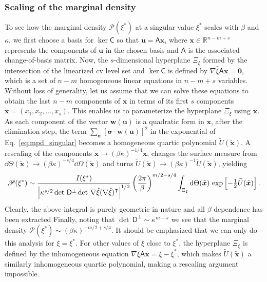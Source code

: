 \subsubsection*{Scaling of the marginal density}
\label{sec:scaling}

To see how the marginal density $\mathscr{P}(\xi^{*})$ at a singular value $\xi^{*}$ scales with $\beta$ and $\kappa$, we first choose a basis for $\ker\mathsf{C}$ so that $\bm{u} = \mathsf{A}\bm{x}$, where $\bm{x} \in \mathbb{R}^{n-m+s}$ represents the components of $\bm{u}$ in the chosen basis and $\mathsf{A}$ is the associated change-of-basis matrix.
Now, the $s$-dimensional hyperplane $\Xi_{\xi}$ formed by the intersection of the linearized \ac{cv} level set and $\ker\mathsf{C}$ is defined by $\nabla\hat{\xi}\mathsf{A}\bm{x} = \bm{0}$, which is a set of $n-m$ homogeneous linear equations in $n-m+s$ variables.
Without loss of generality, let us assume that we can solve these equations to obtain the last $n - m$ components of $\bm{x}$ in terms of its first $s$ components $\tilde{\bm{x}} = (x_{1}, x_{2}, \ldots, x_{s})$.
This enables us to parameterize the hyperplane $\Xi_{\xi}$ using $\tilde{\bm{x}}$.
As each component of the vector $\bm{w}(\bm{u})$ is a quadratic form in $\bm{x}$, after the elimination step, the term $\sum_{\bm{\sigma}}[\bm{\sigma}\cdot\bm{w}(\bm{u})]^{2}$ in the exponential of Eq.~\eqref{eq:mpd_singular} becomes a homogeneous quartic polynomial $\widetilde{U}(\tilde{\bm{x}})$.
A rescaling of the components $\tilde{\bm{x}} \to (\beta\kappa)^{-1/4}\tilde{\bm{x}}$, changes the surface measure from $\dd\Theta(\tilde{\bm{x}}) \to (\beta\kappa)^{-s/4}\dd\Omega(\tilde{\bm{x}})$ and turns $\widetilde{U}(\tilde{\bm{x}}) \to (\beta\kappa)^{-1}\widetilde{U}(\tilde{\bm{x}})$, yielding
%
\begin{equation}
  \mathscr{P}(\xi^{*}) \sim \frac{I({\xi}^{*})}{\left|\kappa^{s/2}\det\,\mathsf{D}^\perp \det\, \nabla\hat{\xi}(\nabla\hat{\xi})^\mathsf{T}\right|^{1/2}}  \left(\frac{2\pi}{\beta}\right)^{m/2 - s/4} \int_{\Xi_{\xi}} \mathrm{d}\Theta(\tilde{\bm{x}})\, \exp\left[-\tfrac{1}{2}\widetilde{U}(\tilde{\bm{x}})\right].
  \label{eq:scaling}
\end{equation}
%
Clearly, the above integral is purely geometric in nature and all $\beta$ dependence has been extracted
Finally, noting that $\det\,\mathsf{D}^{\perp} \sim \kappa^{m - s}$ we see that the marginal density $\mathscr{P}(\xi^{*}) \sim (\beta\kappa)^{-m/2 + s/4}$.
It should be emphasized that we can only do this analysis for $\xi = \xi^{*}$.
For other values of $\xi$ close to $\xi^{*}$, the hyperplane $\Xi_{\xi}$ is defined by the inhomogeneous equation $\nabla\hat{\xi}\mathsf{A}\bm{x} = \xi - \xi^{*}$, which makes $\widetilde{U}(\tilde{\bm{x}})$ a similarly inhomogeneous quartic polynomial, making a rescaling argument impossible.

